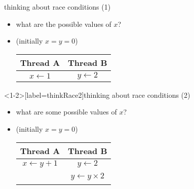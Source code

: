 \begin{frame}{thinking about race conditions (1)}
\begin{itemize}
\item what are the possible values of $x$? \\
\item (initially $x = y = 0$) \\
\begin{tabular}{cc}
    \bfseries{Thread A} & \bfseries{Thread B} \\ \hline
    $x \leftarrow 1$ & $y \leftarrow 2$ \\
\end{tabular}
\iftoggle{heldback}{}{
\item<2-> must be 1. Thread B can't do anything
}
\end{itemize}
\end{frame}

\begin{frame}<1-2>[label=thinkRace2]{thinking about race conditions (2)}
\begin{itemize}
\item what are some possible values of $x$? \\
\item (initially $x = y = 0$) \\
\begin{tabular}{cc}
    \bfseries{Thread A} & \bfseries{Thread B} \\ \hline
    $x \leftarrow y + 1$ & $y \leftarrow 2$ \\
                    ~ & $y \leftarrow y \times 2$ \\
\end{tabular}
\iftoggle{heldback}{}{
\item<2-> if A goes first, then B: $1$
\item<2-> if B goes first, then A: $5$
\item<2-> if B line one, then A, then B line two: $3$
\item<3-> \ldots and why not 7:
    \begin{itemize}
    \item B (start): $y \leftarrow 2 = 0010_{\text{TWO}}$; then y bit 3 $\leftarrow$ 0; y bit 2 $\leftarrow$ 1; then
    \item A: x $\leftarrow 110_{\text{TWO}} + 1 = 7$; then
    \item B (finish): y bit 1 $\leftarrow$ 0; y bit 0 $\leftarrow$ 0
    \end{itemize}
}
\end{itemize}
\end{frame}


